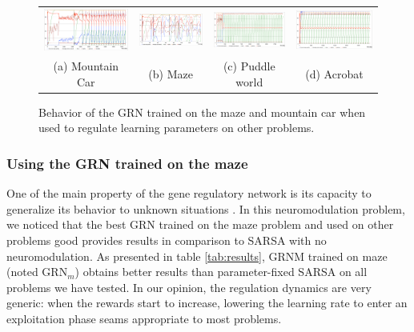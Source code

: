 \begin{figure}[b!]
\center
\setlength{\tabcolsep}{0.5mm}
\begin{tabular}{cccc}
\includegraphics[width=0.245\linewidth]{MC_GRNGenericBehavior.pdf} &
\includegraphics[width=0.245\linewidth]{MZ_GRNGenericBehavior.pdf} &
\includegraphics[width=0.245\linewidth]{PW_GRNGenericBehavior.pdf} &
\includegraphics[width=0.245\linewidth]{ACP_GRNGenericBehavior.pdf} \\
(a) Mountain Car & (b) Maze & (c) Puddle world & (d) Acrobat
\end{tabular}
\caption{Behavior of the GRN trained on the maze and mountain car when used to regulate learning parameters on other problems.}\label{fig:GRNGenericBehavior}
\end{figure}

\subsubsection{Using the GRN trained on the maze}
One of the main property of the gene regulatory network is its capacity to generalize its behavior to unknown situations \cite{sanchez2014gene}. In this neuromodulation problem, we noticed that the best GRN trained on the maze problem and used on other problems good provides results in comparison to SARSA with no neuromodulation. As presented in table \ref{tab:results}, GRNM trained on maze (noted GRN$_{m}$) obtains better results than parameter-fixed SARSA on all problems we have tested. In our opinion, the regulation dynamics are very generic: when the rewards start to increase, lowering the learning rate to enter an exploitation phase seams appropriate to most problems.

